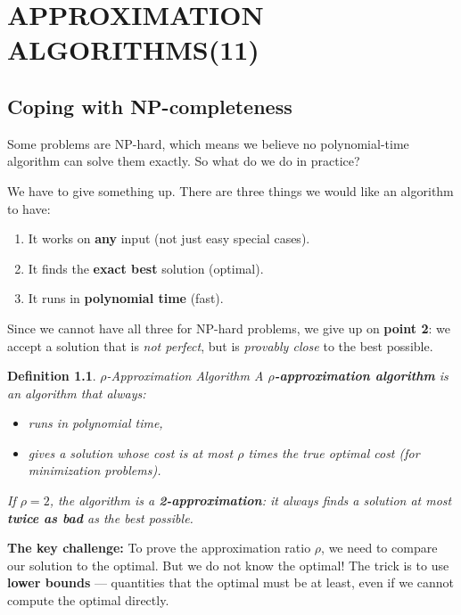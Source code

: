 \documentclass[12pt,a4paper]{report}
\newtheorem{definition}{Definition}
\begin{document}
\chapter{APPROXIMATION ALGORITHMS(11)}

\section{Coping with NP-completeness}

Some problems are NP-hard, which means we believe no polynomial-time algorithm can solve them exactly. So what do we do in practice?

We have to give something up. There are three things we would like an algorithm to have:
\begin{enumerate}
    \item It works on \textbf{any} input (not just easy special cases).
    \item It finds the \textbf{exact best} solution (optimal).
    \item It runs in \textbf{polynomial time} (fast).
\end{enumerate}
Since we cannot have all three for NP-hard problems, we give up on \textbf{point 2}: we accept a solution that is \textit{not perfect}, but is \textit{provably close} to the best possible.

\begin{definition}{$\rho$-Approximation Algorithm}{}
A \textbf{$\rho$-approximation algorithm} is an algorithm that always:
\begin{itemize}
    \item runs in polynomial time,
    \item gives a solution whose cost is at most $\rho$ times the true optimal cost (for minimization problems).
\end{itemize}
If $\rho = 2$, the algorithm is a \textbf{2-approximation}: it always finds a solution at most \textbf{twice as bad} as the best possible.
\end{definition}

\textbf{The key challenge:} To prove the approximation ratio $\rho$, we need to compare our solution to the optimal. But we do not know the optimal! The trick is to use \textbf{lower bounds} --- quantities that the optimal must be at least, even if we cannot compute the optimal directly.

\end{document}
